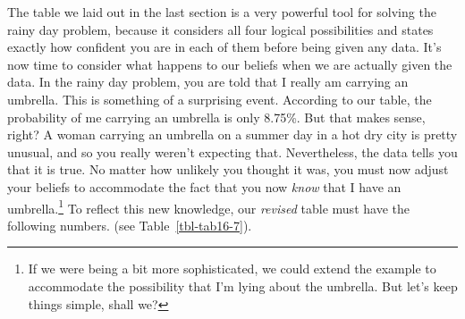 \documentclass[
  a4paper,
]{book}
\begin{document}
The table we laid out in the last section is a very powerful tool for
solving the rainy day problem, because it considers all four logical
possibilities and states exactly how confident you are in each of them
before being given any data. It's now time to consider what happens to
our beliefs when we are actually given the data. In the rainy day
problem, you are told that I really am carrying an umbrella. This is
something of a surprising event. According to our table, the probability
of me carrying an umbrella is only 8.75\%. But that makes sense, right?
A woman carrying an umbrella on a summer day in a hot dry city is pretty
unusual, and so you really weren't expecting that. Nevertheless, the
data tells you that it is true. No matter how unlikely you thought it
was, you must now adjust your beliefs to accommodate the fact that you
now \emph{know} that I have an umbrella.\footnote{If we were being a bit
  more sophisticated, we could extend the example to accommodate the
  possibility that I'm lying about the umbrella. But let's keep things
  simple, shall we?} To reflect this new knowledge, our \emph{revised}
table must have the following numbers. (see Table~\ref{tbl-tab16-7}).

\hypertarget{tbl-tab16-7}{}
 
  \providecommand{\huxb}[2]{\arrayrulecolor[RGB]{#1}\global\arrayrulewidth=#2pt}
  \providecommand{\huxvb}[2]{\color[RGB]{#1}\vrule width #2pt}
  \providecommand{\huxtpad}[1]{\rule{0pt}{#1}}
  \providecommand{\huxbpad}[1]{\rule[-#1]{0pt}{#1}}
\end{document}
